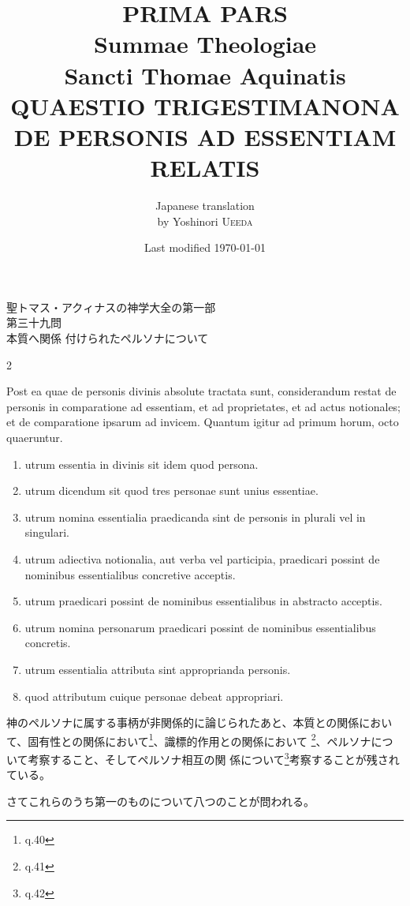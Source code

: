\documentclass[paper=a4paper,fontsize=10pt,jafontsize=9pt,titlepage]{jlreq}
\title{{\bfseries PRIMA PARS}\\{\Huge Summae Theologiae}\\Sancti Thomae
Aquinatis\\{\sffamily QUAESTIO TRIGESTIMANONA}\\DE PERSONIS AD
ESSENTIAM RELATIS}
\author{Japanese translation\\by Yoshinori {\scshape Ueeda}}
\date{Last modified \today}
\begin{document}
\maketitle


\begin{center}
{\Large 聖トマス・アクィナスの神学大全の第一部\\第三十九問\\本質へ関係
 付けられたペルソナについて}
\end{center}




\newpage
\begin{paracol}{2}

{\Huge P}ost ea quae de personis divinis absolute tractata sunt, considerandum
 restat de personis in comparatione ad essentiam, et ad proprietates, et
 ad actus notionales; et de comparatione ipsarum ad invicem. Quantum
 igitur ad primum horum, octo quaeruntur. 

\begin{enumerate}
 \item utrum essentia in divinis sit idem quod persona.
 \item utrum dicendum sit quod tres personae sunt unius essentiae.
 \item utrum nomina essentialia praedicanda sint de personis in plurali
       vel in singulari.
 \item utrum adiectiva notionalia, aut verba vel participia, praedicari
       possint de nominibus essentialibus concretive acceptis.
 \item utrum praedicari possint de nominibus essentialibus in abstracto
       acceptis.
 \item utrum nomina personarum praedicari possint de nominibus
       essentialibus concretis.
 \item utrum essentialia attributa sint approprianda personis.
 \item quod attributum cuique personae debeat appropriari.
\end{enumerate}

\switchcolumn

神のペルソナに属する事柄が非関係的に論じられたあと、本質との関係におい
て、固有性との関係において\footnote{q.40}、識標的作用との関係において
\footnote{q.41}、ペルソナについて考察すること、そしてペルソナ相互の関
係について\footnote{q.42}考察することが残されている。

さてこれらのうち第一のものについて八つのことが問われる。


\end{paracol}
\end{document}
